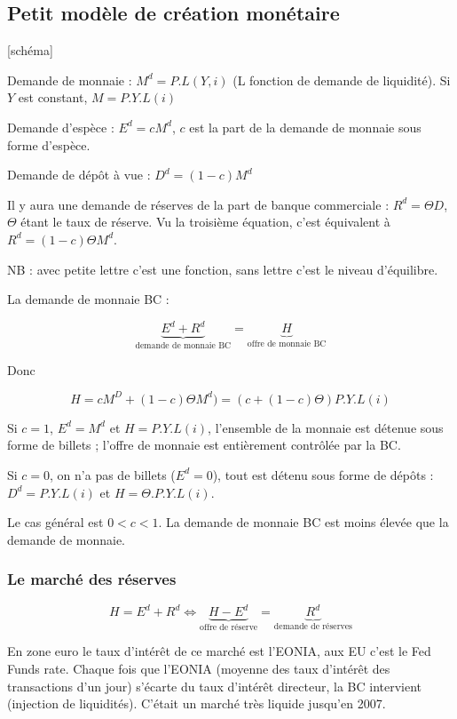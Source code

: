 	\subsection{Petit modèle de création monétaire}
	
	[schéma]
	
	Demande de monnaie : $ M^d = P. L (Y, i)$ (L fonction de demande de liquidité). Si $Y$ est constant, $M = P.Y.L(i)$
	
	Demande d'espèce : $E^d = c M^d$, $c$ est la part de la demande de monnaie sous forme d'espèce.
	
	Demande de dépôt à vue : $D^d = (1 - c) M^d$
	
	Il y aura une demande de réserves de la part de banque commerciale : $R^d = \Theta D$, $\Theta$ étant le taux de réserve. Vu la troisième équation, c'est équivalent à $R^d = (1 - c)\Theta M^d$.
	
	NB : avec petite lettre c'est une fonction, sans lettre c'est le niveau d'équilibre.
	
	La demande de monnaie BC :
	
	$$\underbrace{E^d + R^d}_{\text{demande de monnaie BC}} = \underbrace{H}_{\text{offre de monnaie BC}}$$
	
	Donc
	
	$$H = c M^D + (1 - c) \Theta M^d) = (c + (1 - c) \Theta) P . Y . L(i)$$
	
	Si $c = 1$, $E^d = M^d$ et $H = P . Y . L(i)$, l'ensemble de la monnaie est détenue sous forme de billets ; l'offre de monnaie est entièrement contrôlée par la BC.
	
	Si $c = 0$, on n'a pas de billets ($E^d = 0$), tout est détenu sous forme de dépôts : $D^d = P.Y.L(i)$ et $H = \Theta . P . Y . L(i)$.
	
	Le cas général est $0 < c < 1$. La demande de monnaie BC est moins élevée que la demande de monnaie.
	
	\subsubsection{Le marché des réserves}
	
	$$H = E^d + R^d \Leftrightarrow \underbrace{H - E^d}_{\text{offre de réserve}} = \underbrace{R^d}_{\text{demande de réserves}}$$
	
	En zone euro le taux d'intérêt de ce marché est l'EONIA, aux EU c'est le Fed Funds rate. Chaque fois que l'EONIA (moyenne des taux d'intérêt des transactions d'un jour) s'écarte du taux d'intérêt directeur, la BC intervient (injection de liquidités). C'était un marché très liquide jusqu'en 2007.
	
